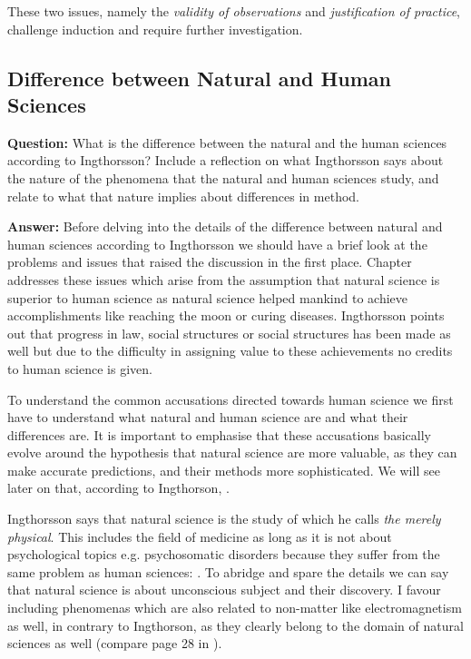 \documentclass[11pt]{scrartcl}
\begin{document}
These two issues, namely the \textit{validity of observations} and \textit{justification of practice}, challenge induction and require further investigation.

\subsection{Difference between Natural and Human Sciences}

\textbf{Question:} What is the difference between the natural and the human sciences according to Ingthorsson? Include a reflection on what Ingthorsson says about the nature of the phenomena that the natural and human sciences study, and relate to what that nature implies about differences in method.

\bigbreak

\textbf{Answer:} Before delving into the details of the difference between natural and human sciences according to Ingthorsson we should have a brief look at the problems and issues that raised the discussion in the first place. Chapter  \cite[p. 29]{ingtho} addresses these issues which arise from the assumption that natural science is superior to human science as natural science helped mankind to achieve accomplishments like reaching the moon or curing diseases. Ingthorsson points out that progress in law, social structures or social structures has been made as well but due to the difficulty in assigning value to these achievements no credits to human science is given.

To understand the common accusations directed towards human science we first have to understand what natural and human science are and what their differences are. It is important to emphasise that these accusations basically evolve around the hypothesis that natural science are more valuable, as they can make accurate predictions, and their methods more sophisticated. We will see later on that, according to Ingthorson,  \cite[p. 40]{ingtho}.

Ingthorsson says that natural science is the study of  \cite[p. 40]{ingtho} which he calls \textit{the merely physical}. This includes the field of medicine as long as it is not about psychological topics e.g. psychosomatic disorders because they suffer from the same problem as human sciences:  \cite[p. 28]{ingtho}. To abridge and spare the details we can say that natural science is about unconscious subject and their discovery. I favour including phenomenas which are also related to non-matter like electromagnetism as well, in contrary to Ingthorson, as they clearly belong to the domain of natural sciences as well (compare page 28 in \cite{ingtho}).
\end{document}
